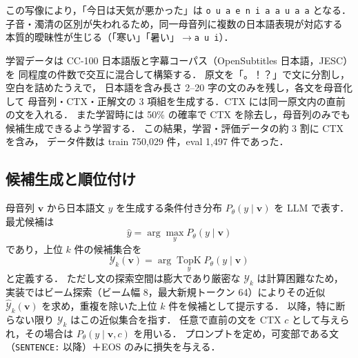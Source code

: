 この写像により，「今日は天気が悪かった」は
\texttt{o u a e n i a a u a a} となる．
子音・濁清の区別が失われるため，同一母音列に複数の日本語表現が対応する
本質的曖昧性が生じる（「寒い」「暑い」$\to$\texttt{a u i}）．

学習データは CC-100 日本語版\cite{conneau2020xlmr}と字幕コーパス（OpenSubtitles 日本語\cite{lison2016opensubtitles}，JESC\cite{pryzant2018jesc}）を
同程度の件数で交互に混合して構築する．
原文を「。！？」で文に分割し，空白を詰めたうえで，
日本語を含み長さ 2--20 字の文のみを残し，各文を母音化して
母音列・CTX・正解文の 3 項組を生成する．CTX には同一原文内の直前の文を入れる．
また学習時には 50\% の確率で CTX を除去し，母音列のみでも候補生成できるよう学習する．
この結果，学習・評価データの約 3 割に CTXを含み，
データ件数は train 750{,}029 件，eval 1{,}497 件であった．

\subsection{候補生成と順位付け}
母音列 $\bm{v}$ から日本語文 $y$ を生成する条件付き分布 $P_\theta(y\mid \bm{v})$ を LLM で表す．
最尤候補は
\begin{equation}
  \hat{y} = \arg\max_{y} P_\theta(y \mid \bm{v})
\end{equation}
であり，上位 $k$ 件の候補集合を
\begin{equation}
  \mathcal{Y}_k(\bm{v}) = \arg\operatorname*{TopK}_{y} P_\theta(y \mid \bm{v})
\end{equation}
と定義する．
ただし文の探索空間は膨大であり厳密な $\mathcal{Y}_k$ は計算困難なため，
実装ではビーム探索（ビーム幅 8，最大新規トークン 64）によりその近似
$\hat{\mathcal{Y}}_k(\bm{v})$ を求め，重複を除いた上位 $k$ 件を候補として提示する．
以降，特に断らない限り $\mathcal{Y}_k$ はこの近似集合を指す．
任意で直前の文を CTX $c$ として与えられ，その場合は $P_\theta(y\mid \bm{v}, c)$ を用いる．
プロンプトを定め，可変部である文（\texttt{SENTENCE:} 以降）＋EOS のみに損失を与える．

